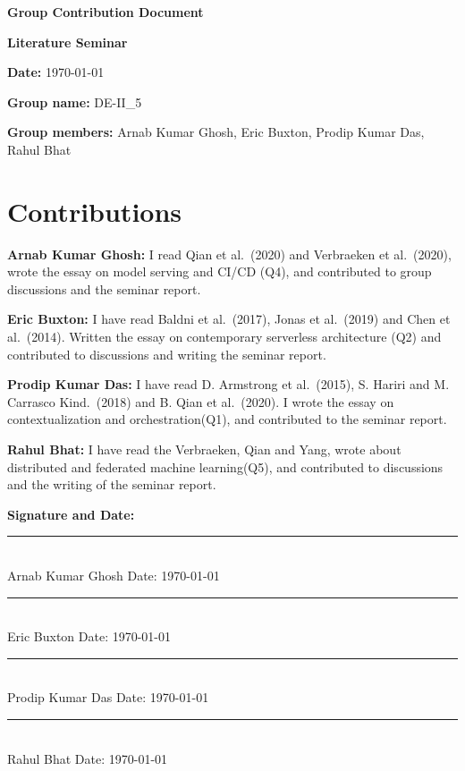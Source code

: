 \documentclass[12pt,a4paper]{article}
\begin{document}
\begin{center}
    {\Large\bfseries Group Contribution Document}
\end{center}

\bigskip

\textbf{Literature Seminar}

\textbf{Date:} \today

\textbf{Group name:} DE-II\_5

\textbf{Group members:} Arnab Kumar Ghosh, Eric Buxton, Prodip Kumar Das, Rahul Bhat

\bigskip
\section*{Contributions}

\textbf{Arnab Kumar Ghosh:} I read Qian et al.\ (2020) and Verbraeken et al.\ (2020), wrote the essay on model serving and CI/CD (Q4), and contributed to group discussions and the seminar report.

\textbf{Eric Buxton:}  I have read Baldni et al.\ (2017),  Jonas et al.\ (2019) and Chen et al.\ (2014). Written the essay on contemporary serverless architecture (Q2) and contributed to discussions and writing the seminar report.

\textbf{Prodip Kumar Das:} I have read D. Armstrong et al.\ (2015), S. Hariri and M. Carrasco Kind.\ (2018) and B. Qian et al.\ (2020). I wrote the essay on contextualization and orchestration(Q1), and contributed to the seminar report.

\textbf{Rahul Bhat:} I have read the Verbraeken, Qian and Yang, wrote about distributed and federated machine learning(Q5), and contributed to discussions and the writing of the seminar report.

\bigskip\bigskip

\textbf{Signature and Date:}

\bigskip

\noindent\rule{\linewidth}{0.4pt}\\
Arnab Kumar Ghosh \hfill Date: \today

\bigskip

\noindent\rule{\linewidth}{0.4pt}\\
Eric Buxton \hfill Date: \today

\bigskip

\noindent\rule{\linewidth}{0.4pt}\\
Prodip Kumar Das \hfill Date: \today

\bigskip

\noindent\rule{\linewidth}{0.4pt}\\
Rahul Bhat \hfill Date: \today
\end{document}
